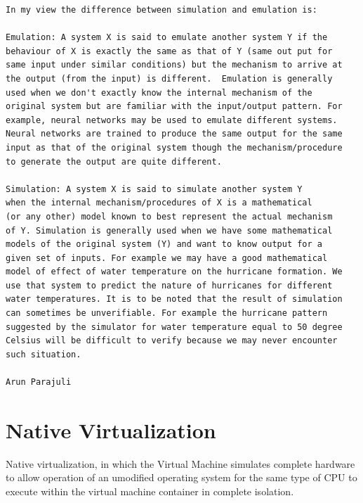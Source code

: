 \begin{verbatim}
In my view the difference between simulation and emulation is:

Emulation: A system X is said to emulate another system Y if the
behaviour of X is exactly the same as that of Y (same out put for
same input under similar conditions) but the mechanism to arrive at
the output (from the input) is different.  Emulation is generally
used when we don't exactly know the internal mechanism of the
original system but are familiar with the input/output pattern. For
example, neural networks may be used to emulate different systems.
Neural networks are trained to produce the same output for the same
input as that of the original system though the mechanism/procedure
to generate the output are quite different.

Simulation: A system X is said to simulate another system Y
when the internal mechanism/procedures of X is a mathematical
(or any other) model known to best represent the actual mechanism
of Y. Simulation is generally used when we have some mathematical
models of the original system (Y) and want to know output for a
given set of inputs. For example we may have a good mathematical
model of effect of water temperature on the hurricane formation. We
use that system to predict the nature of hurricanes for different
water temperatures. It is to be noted that the result of simulation
can sometimes be unverifiable. For example the hurricane pattern
suggested by the simulator for water temperature equal to 50 degree
Celsius will be difficult to verify because we may never encounter
such situation.

Arun Parajuli
\end{verbatim}


\section{Native Virtualization}

Native virtualization, in which the Virtual Machine simulates complete hardware
to allow operation of an umodified operating system for the same type of CPU to
execute within the virtual machine container in complete isolation.

